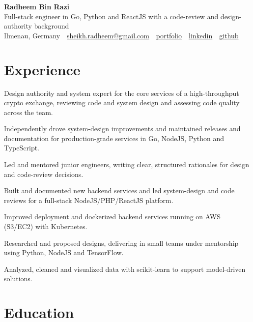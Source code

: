 \documentclass[11pt,a4paper]{resume}
\makeatletter
\newcommand{\Portfolio}{https://radheem.github.io/my-cv}
\newcommand{\PortfolioText}{portfolio}
\newcommand{\GitHub}{https://github.com/radheem}
\newcommand{\LinkedIn}{https://www.linkedin.com/in/radheem-razi}
\newcommand{\Email}{sheikh.radheem@gmail.com}
\makeatother
\begin{document}
\begin{center}
  {\huge\bfseries Radheem Bin Razi}\\[3pt]
  {\large Full-stack engineer in Go, Python and ReactJS with a code-review and design-authority background}\\[6pt]
  \small
  Ilmenau, Germany \,\textbar\,
  \href{mailto:\Email}{\Email} \,\textbar\,
  \href{\Portfolio}{\PortfolioText} \,\textbar\,
  \href{\LinkedIn}{linkedin} \,\textbar\,
  \href{\GitHub}{github}
\end{center}
\vspace{2pt}

\section{Experience}

\bullets
  \item Design authority and system expert for the core services of a high-throughput crypto exchange, reviewing code and system design and assessing code quality across the team.
  \item Independently drove system-design improvements and maintained releases and documentation for production-grade services in Go, NodeJS, Python and TypeScript.
  \item Led and mentored junior engineers, writing clear, structured rationales for design and code-review decisions.
\bulletsend
\vspace{3pt}
\bullets
  \item Built and documented new backend services and led system-design and code reviews for a full-stack NodeJS/PHP/ReactJS platform.
  \item Improved deployment and dockerized backend services running on AWS (S3/EC2) with Kubernetes.
\bulletsend
\vspace{3pt}
\bullets
  \item Researched and proposed designs, delivering in small teams under mentorship using Python, NodeJS and TensorFlow.
  \item Analyzed, cleaned and visualized data with scikit-learn to support model-driven solutions.
\bulletsend
\vspace{3pt}

\section{Education}
\end{document}
